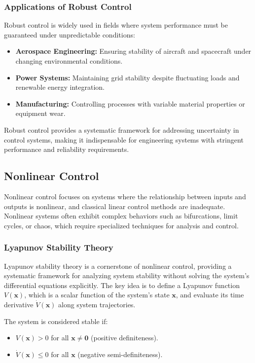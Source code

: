 \documentclass{IEEEojcsys}
\begin{document}
\subsubsection{Applications of Robust Control}
Robust control is widely used in fields where system performance must be guaranteed under unpredictable conditions:
\begin{itemize}
    \item \textbf{Aerospace Engineering:} Ensuring stability of aircraft and spacecraft under changing environmental conditions.
    \item \textbf{Power Systems:} Maintaining grid stability despite fluctuating loads and renewable energy integration.
    \item \textbf{Manufacturing:} Controlling processes with variable material properties or equipment wear.
\end{itemize}

Robust control provides a systematic framework for addressing uncertainty in control systems, making it indispensable for engineering systems with stringent performance and reliability requirements.

\subsection{Nonlinear Control}
Nonlinear control focuses on systems where the relationship between inputs and outputs is nonlinear, and classical linear control methods are inadequate. Nonlinear systems often exhibit complex behaviors such as bifurcations, limit cycles, or chaos, which require specialized techniques for analysis and control.

\subsubsection{Lyapunov Stability Theory}
Lyapunov stability theory is a cornerstone of nonlinear control, providing a systematic framework for analyzing system stability without solving the system's differential equations explicitly. The key idea is to define a Lyapunov function $V(\mathbf{x})$, which is a scalar function of the system's state $\mathbf{x}$, and evaluate its time derivative $\dot{V}(\mathbf{x})$ along system trajectories.

The system is considered stable if:
\begin{itemize}
    \item $V(\mathbf{x}) > 0$ for all $\mathbf{x} \neq \mathbf{0}$ (positive definiteness).
    \item $\dot{V}(\mathbf{x}) \leq 0$ for all $\mathbf{x}$ (negative semi-definiteness).
\end{itemize}
\end{document}

